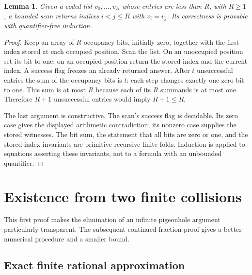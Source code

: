 \documentclass[11pt,letterpaper]{article}
\newtheorem{lemma}[theorem]{Lemma}
\theoremstyle{definition}
\begin{document}
\begin{lemma}\label{lem:pigeonhole}
Given a coded list $v_0,\ldots,v_R$ whose entries are less than $R$, with
$R\ge1$, a bounded scan returns indices $i<j\le R$ with $v_i=v_j$.
Its correctness is provable with quantifier-free induction.
\end{lemma}
\begin{proof}
Keep an array of $R$ occupancy bits, initially zero, together with the first
index stored at each occupied position. Scan the list. On an unoccupied
position set its bit to one; on an occupied position return the stored index
and the current index. A success flag freezes an already returned answer.
After $t$ unsuccessful entries the sum of the occupancy bits is $t$:
each step changes exactly one zero bit to one. This sum is at most $R$
because each of its $R$ summands is at most one. Therefore $R+1$
unsuccessful entries would imply $R+1\le R$.

The last argument is constructive. The scan's success flag is decidable.
Its zero case gives the displayed arithmetic contradiction; its nonzero
case supplies the stored witnesses. The bit sum, the statement that all
bits are zero or one, and the stored-index invariants are primitive
recursive finite folds. Induction is applied to equations asserting these
invariants, not to a formula with an unbounded quantifier.
\end{proof}

\section{Existence from two finite collisions}\label{sec:collision}

This first proof makes the elimination of an infinite pigeonhole argument
particularly transparent. The subsequent continued-fraction proof gives a
better numerical procedure and a smaller bound.

\subsection{Exact finite rational approximation}
\end{document}
